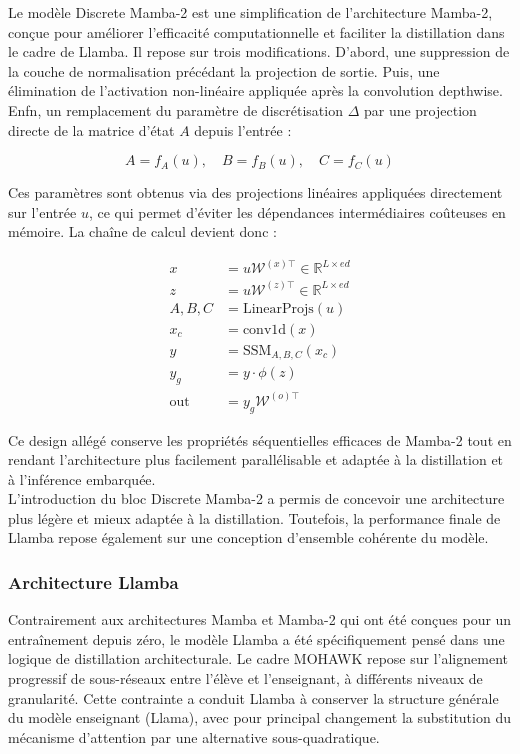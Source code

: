 Le modèle Discrete Mamba-2 est une simplification de l'architecture Mamba-2, conçue pour améliorer l'efficacité computationnelle et faciliter la distillation dans le cadre de Llamba. Il repose sur trois modifications. D'abord, une suppression de la couche de normalisation précédant la projection de sortie. Puis, une élimination de l'activation non-linéaire appliquée après la convolution depthwise. Enfn, un  remplacement du paramètre de discrétisation $\Delta$ par une projection directe de la matrice d'état $A$ depuis l'entrée :

\begin{equation}
A = f_A(u), \quad B = f_B(u), \quad C = f_C(u)
\end{equation}

Ces paramètres sont obtenus via des projections linéaires appliquées directement sur l'entrée $u$, ce qui permet d'éviter les dépendances intermédiaires coûteuses en mémoire. La chaîne de calcul devient donc :

\begin{align*}
x &= u \mathcal{W}^{(x)\top} \in \mathbb{R}^{L \times ed} \\
z &= u \mathcal{W}^{(z)\top} \in \mathbb{R}^{L \times ed} \\
A, B, C &= \text{LinearProjs}(u) \\
x_c &= \text{conv1d}(x) \\
y &= \text{SSM}_{A,B,C}(x_c) \\
y_g &= y \cdot \phi(z) \\
\text{out} &= y_g \mathcal{W}^{(o)\top}
\end{align*}

Ce design allégé conserve les propriétés séquentielles efficaces de Mamba-2 tout en rendant l'architecture plus facilement parallélisable et adaptée à la distillation et à l'inférence embarquée.\\

L’introduction du bloc Discrete Mamba-2 a permis de concevoir une architecture plus légère et mieux adaptée à la distillation. Toutefois, la performance finale de Llamba repose également sur une conception d’ensemble cohérente du modèle. 

\subsubsection{Architecture Llamba}

Contrairement aux architectures Mamba et Mamba-2 qui ont été conçues pour un entraînement depuis zéro, le modèle Llamba a été spécifiquement pensé dans une logique de distillation architecturale. Le cadre MOHAWK repose sur l'alignement progressif de sous-réseaux entre l'élève et l'enseignant, à différents niveaux de granularité. Cette contrainte a conduit Llamba à conserver la structure générale du modèle enseignant (Llama), avec pour principal changement la substitution du mécanisme d'attention par une alternative sous-quadratique.


